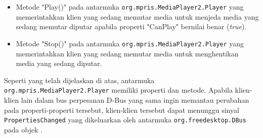 \begin{itemize}
    \item Metode "Play()" pada antarmuka \verb|org.mpris.MediaPlayer2.Player| yang memerintahkan klien yang sedang memutar media untuk menjeda media yang sedang memutar diputar apabila properti "CanPlay" bernilai benar (\textit{true}).
    
    \item Metode "Stop()" pada antarmuka \verb|org.mpris.MediaPlayer2.Player| yang memerintahkan klien yang sedang memutar media untuk menghentikan media yang sedang diputar.
\end{itemize}

Seperti yang telah dijelaskan di atas, antarmuka \verb|org.mpris.MediaPlayer2.Player| memiliki properti dan metode. Apabila klien-klien lain dalam bus perpesanan D-Bus yang sama ingin memantau perubahan pada properti-properti tersebut, klien-klien tersebut dapat menunggu sinyal \verb|PropertiesChanged| yang dikeluarkan oleh antarmuka \verb|org.freedesktop.DBus| pada objek .

